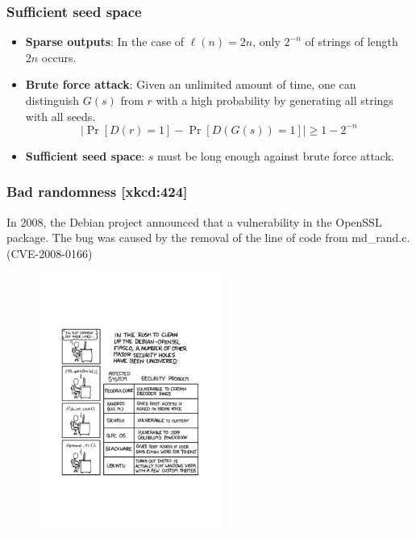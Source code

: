 \begin{frame}\frametitle{Sufficient seed space}
\begin{itemize}
\item \textbf{Sparse outputs}: In the case of $\ell(n)=2n$, only $2^{-n}$ of strings of length $2n$ occurs.
\item \textbf{Brute force attack}: Given an unlimited amount of time, one can distinguish $G(s)$ from $r$ with a high probability by generating all strings with all seeds.
\[  \left|\Pr[D(r)=1] - \Pr[D(G(s))=1]\right| \ge 1-2^{-n} \]
\item \textbf{Sufficient seed space}: $s$ must be long enough against brute force attack.
\end{itemize}
\end{frame}
\begin{frame}\frametitle{Bad randomness [xkcd:424]}
In 2008, the Debian project announced that a vulnerability in the OpenSSL package. The bug was caused by the removal of the line of code from md\_rand.c. (CVE-2008-0166)
\begin{figure}
\begin{center}
\includegraphics[width=60mm]{pic/holes} 
\end{center}
\end{figure}
\end{frame}
